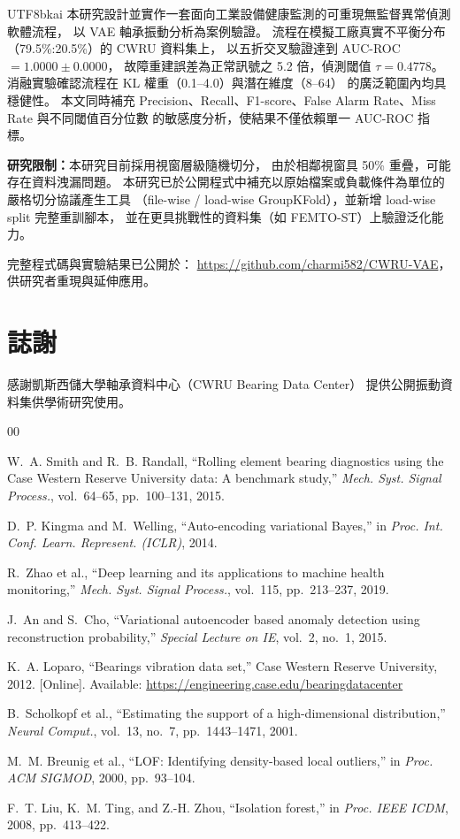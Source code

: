 \documentclass[conference]{IEEEtran}
\begin{document}
\begin{CJK}{UTF8}{bkai}
本研究設計並實作一套面向工業設備健康監測的可重現無監督異常偵測軟體流程，
以 VAE 軸承振動分析為案例驗證。
流程在模擬工廠真實不平衡分布（79.5\%:20.5\%）的 CWRU 資料集上，
以五折交叉驗證達到 AUC-ROC $= 1.0000\pm0.0000$，
故障重建誤差為正常訊號之 5.2 倍，偵測閾值 $\tau = 0.4778$。
消融實驗確認流程在 KL 權重（0.1--4.0）與潛在維度（8--64）
的廣泛範圍內均具穩健性。
本文同時補充 Precision、Recall、F1-score、False Alarm Rate、Miss Rate 與不同閾值百分位數
的敏感度分析，使結果不僅依賴單一 AUC-ROC 指標。

\textbf{研究限制：}本研究目前採用視窗層級隨機切分，
由於相鄰視窗具 50\% 重疊，可能存在資料洩漏問題。
本研究已於公開程式中補充以原始檔案或負載條件為單位的嚴格切分協議產生工具
（file-wise / load-wise GroupKFold），並新增 load-wise split 完整重訓腳本，
並在更具挑戰性的資料集（如 FEMTO-ST）上驗證泛化能力。

完整程式碼與實驗結果已公開於：
\url{https://github.com/charmi582/CWRU-VAE}，
供研究者重現與延伸應用。

\section*{誌謝}
感謝凱斯西儲大學軸承資料中心（CWRU Bearing Data Center）
提供公開振動資料集供學術研究使用。

\begin{thebibliography}{00}

W.~A. Smith and R.~B. Randall,
``Rolling element bearing diagnostics using the Case Western Reserve
University data: A benchmark study,''
\textit{Mech. Syst. Signal Process.}, vol.~64--65, pp.~100--131, 2015.

D.~P. Kingma and M.~Welling,
``Auto-encoding variational Bayes,''
in \textit{Proc. Int. Conf. Learn. Represent. (ICLR)}, 2014.

R.~Zhao et al.,
``Deep learning and its applications to machine health monitoring,''
\textit{Mech. Syst. Signal Process.}, vol.~115, pp.~213--237, 2019.

J.~An and S.~Cho,
``Variational autoencoder based anomaly detection using reconstruction
probability,'' \textit{Special Lecture on IE}, vol.~2, no.~1, 2015.

K.~A. Loparo,
``Bearings vibration data set,'' Case Western Reserve University, 2012.
[Online]. Available: \url{https://engineering.case.edu/bearingdatacenter}

B.~Scholkopf et al.,
``Estimating the support of a high-dimensional distribution,''
\textit{Neural Comput.}, vol.~13, no.~7, pp.~1443--1471, 2001.

M.~M. Breunig et al.,
``LOF: Identifying density-based local outliers,''
in \textit{Proc. ACM SIGMOD}, 2000, pp.~93--104.

F.~T. Liu, K.~M. Ting, and Z.-H. Zhou,
``Isolation forest,'' in \textit{Proc. IEEE ICDM}, 2008, pp.~413--422.

\end{thebibliography}

\end{CJK}
\end{document}
